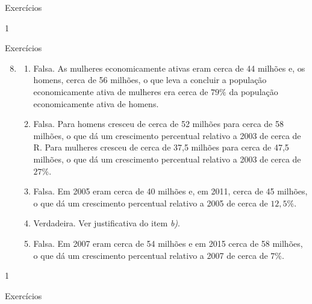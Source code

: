{\begin{answer}{Exercícios}
{\begin{enumerate}
\begin{figure}[H]
  \end{figure}
  \end{enumerate}
}{1}
\end{answer}
\clearmargin
\begin{answer}{Exercícios}
{\exerciselist
  \begin{enumerate}\setcounter{enumi}{7}
  \item 
  \begin{enumerate}
  \item Falsa. As mulheres economicamente ativas eram cerca de 44 milhões e, os homens, cerca de 56 milhões, o que leva a concluir a população economicamente ativa de mulheres era cerca de $79\%$ da população economicamente ativa de homens.
  \item Falsa. Para homens cresceu de cerca de 52 milhões para cerca de 58 milhões, o que dá um crescimento percentual relativo a 2003 de cerca de R. Para mulheres cresceu de cerca de 37,5 milhões para cerca de 47,5 milhões, o que dá um crescimento percentual relativo a 2003 de cerca de $27\%$.
  \item Falsa. Em 2005 eram cerca de 40 milhões e, em 2011, cerca de 45 milhões, o que dá um crescimento percentual relativo a 2005 de cerca de $12,5\%.$
  \item Verdadeira. Ver justificativa do item \textit{b)}.
  \item Falsa. Em 2007 eram cerca de 54 milhões e em 2015 cerca de 58 milhões, o que dá um crescimento percentual relativo a 2007 de cerca de $7\%$.
  \end{enumerate}
    \end{enumerate}
}{1}
\end{answer}
\clearmargin
\begin{answer}{Exercícios}
{\exerciselist
  \begin{enumerate}\setcounter{enumi}{8}

\end{enumerate}}
\end{answer}}
